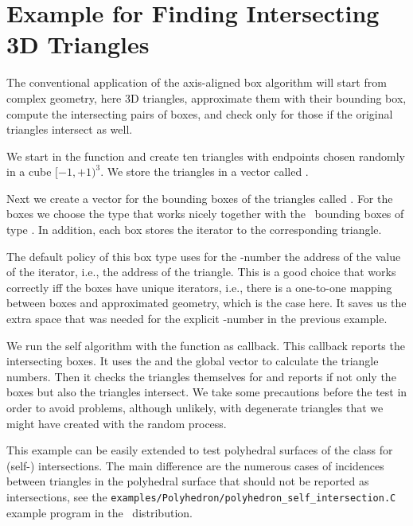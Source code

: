 

\section{Example for Finding Intersecting 3D Triangles}

The conventional application of the axis-aligned box 
algorithm will start from complex geometry, here 3D triangles,
approximate them with their bounding box, compute the intersecting
pairs of boxes, and check only for those if the original triangles
intersect as well.

We start in the  function and create ten triangles with
endpoints chosen randomly in a cube $[-1,+1)^3$. We store the
triangles in a vector called .

Next we create a vector for the bounding boxes of the triangles called
. For the boxes we choose the type
 that works nicely together
with the \cgal\ bounding boxes of type . In
addition, each box stores the iterator to the corresponding triangle.

The default policy of this box type uses for the -number the 
address of the value of the iterator, i.e., the address of the
triangle. This is a good choice that works correctly iff the boxes
have unique iterators, i.e., there is a one-to-one mapping between
boxes and approximated geometry, which is the case here. It saves us
the extra space that was needed for the explicit -number in
the previous example.

We run the self  algorithm with the 
function as callback. This callback reports the intersecting boxes. It
uses the  and the global  vector to
calculate the triangle numbers. Then it checks the triangles
themselves for  and reports if not only the boxes but also
the triangles intersect. We take some precautions before the
 test in order to avoid problems, although unlikely, with
degenerate triangles that we might have created with the random
process.

This example can be easily extended to test polyhedral surfaces of the
 class for (self-) intersections. The main
difference are the numerous cases of incidences between triangles in
the polyhedral surface that should not be reported as intersections,
see the \texttt{examples/Polyhedron/polyhedron\_self\_intersection.C}
example program in the \cgal\ distribution. 

